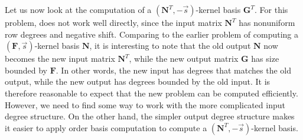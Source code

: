 Let us now look at the computation of a $\left(\mathbf{N}^{T},-\vec{s}\right)$-kernel
basis $\mathbf{G}^{T}$. For this problem, 
does not work well directly, since the input matrix $\mathbf{N}^{T}$
has nonuniform row degrees and negative shift. Comparing to the earlier
problem of computing a $\left(\mathbf{F},\vec{s}\right)$-kernel basis
$\mathbf{N}$, it is interesting to note that the old output $\mathbf{N}$
now becomes the new input matrix $\mathbf{N}^{T}$, while the new
output matrix $\mathbf{G}$ has size bounded by $\mathbf{F}$. In
other words, the new input has degrees that matches the old output,
while the new output has degrees bounded by the old input. It is
therefore reasonable to expect that the new problem can be computed
efficiently. However, we need to find some way to work with the more
complicated input degree structure. On the other hand, the simpler
output degree structure makes it easier to apply order basis computation
to compute a $\left(\mathbf{N}^{T},-\vec{s}\right)$-kernel basis. 

